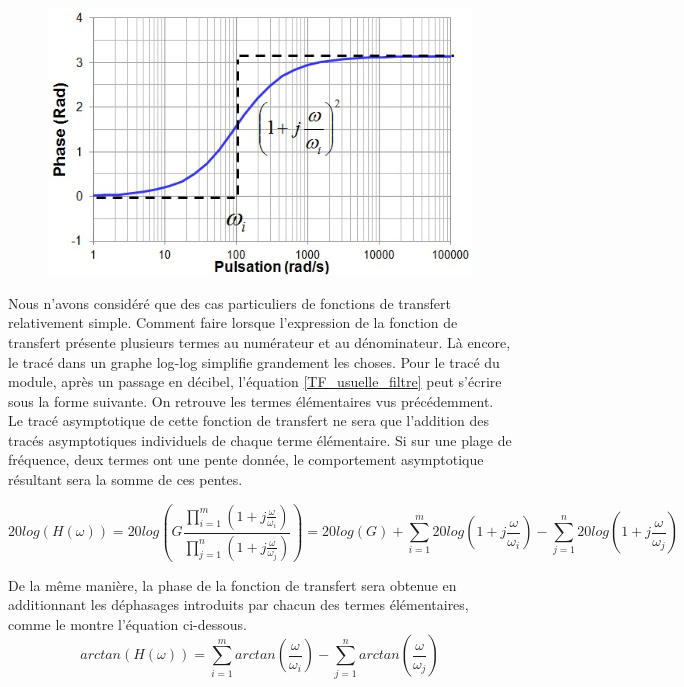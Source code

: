 	\begin{figure}[h!]
		\centering
		\includegraphics[scale=0.6]{images/Trace_asympt_phase_1_plus_jw_carre.jpg}
	\end{figure}
	
	Nous n'avons considéré que des cas particuliers de fonctions de transfert relativement simple. Comment faire lorsque l'expression de la fonction de transfert présente plusieurs termes au numérateur et au dénominateur. Là encore, le tracé dans un graphe log-log simplifie grandement les choses. Pour le tracé du module, après un passage en décibel, l'équation \ref{TF_usuelle_filtre} peut s'écrire sous la forme suivante. On retrouve les termes élémentaires vus précédemment. Le tracé asymptotique de cette fonction de transfert ne sera que l'addition des tracés asymptotiques individuels de chaque terme élémentaire. Si sur une plage de fréquence, deux termes ont une pente donnée, le comportement asymptotique résultant sera la somme de ces pentes. 
	
	\begin{equation}\label{}
	20log(H(\omega))=20log(G\frac{\prod_{i=1}^{m}(1+j\frac{\omega}{\omega_{i}})}{\prod_{j=1}^{n}(1+j\frac{\omega}{\omega_{j}})})=20log(G)+\sum_{i=1}^{m}20log(1+j\frac{\omega}{\omega_{i}})-\sum_{j=1}^{n}20log(1+j\frac{\omega}{\omega_{j}})
	\end{equation}
	
	De la même manière, la phase de la fonction de transfert sera obtenue en additionnant les déphasages introduits par chacun des termes élémentaires, comme le montre l'équation ci-dessous.
	\begin{equation}\label{key}
	arctan(H(\omega))=\sum_{i=1}^{m}arctan(\frac{\omega}{\omega_{i}})-\sum_{j=1}^{n}arctan(\frac{\omega}{\omega_{j}})
	\end{equation}
	
